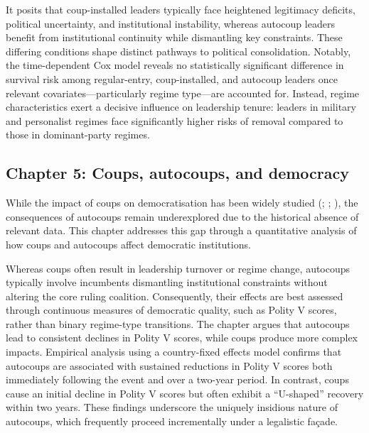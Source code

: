 \documentclass[
  12pt,
]{report}
\begin{document}
It posits that coup-installed leaders typically face heightened
legitimacy deficits, political uncertainty, and institutional
instability, whereas autocoup leaders benefit from institutional
continuity while dismantling key constraints. These differing conditions
shape distinct pathways to political consolidation. Notably, the
time-dependent Cox model reveals no statistically significant difference
in survival risk among regular-entry, coup-installed, and autocoup
leaders once relevant covariates---particularly regime type---are
accounted for. Instead, regime characteristics exert a decisive
influence on leadership tenure: leaders in military and personalist
regimes face significantly higher risks of removal compared to those in
dominant-party regimes.

\subsection*{Chapter 5: Coups, autocoups, and
democracy}\label{chapter-5-coups-autocoups-and-democracy}

While the impact of coups on democratisation has been widely studied
(;
; ), the consequences of autocoups remain
underexplored due to the historical absence of relevant data. This
chapter addresses this gap through a quantitative analysis of how coups
and autocoups affect democratic institutions.

Whereas coups often result in leadership turnover or regime change,
autocoups typically involve incumbents dismantling institutional
constraints without altering the core ruling coalition. Consequently,
their effects are best assessed through continuous measures of
democratic quality, such as Polity V scores, rather than binary
regime-type transitions. The chapter argues that autocoups lead to
consistent declines in Polity V scores, while coups produce more complex
impacts. Empirical analysis using a country-fixed effects model confirms
that autocoups are associated with sustained reductions in Polity V
scores both immediately following the event and over a two-year period.
In contrast, coups cause an initial decline in Polity V scores but often
exhibit a ``U-shaped'' recovery within two years. These findings
underscore the uniquely insidious nature of autocoups, which frequently
proceed incrementally under a legalistic façade.
\end{document}
